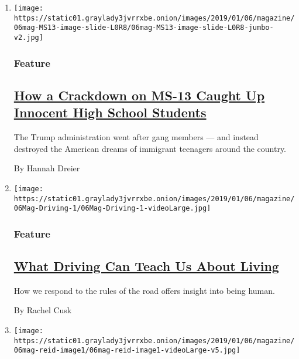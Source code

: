 \begin{enumerate}
\def\labelenumi{\arabic{enumi}.}
\item
  \texttt{[image: https://static01.graylady3jvrrxbe.onion/images/2019/01/06/magazine/06mag-MS13-image-slide-L0R8/06mag-MS13-image-slide-L0R8-jumbo-v2.jpg]}

  \hypertarget{feature}{%
  \subsubsection{Feature}\label{feature}}

  \hypertarget{how-a-crackdown-on-ms-13-caught-up-innocent-high-school-students}{%
  \subsection{\texorpdfstring{\href{/2018/12/27/magazine/ms13-deportation-ice.html}{How
  a Crackdown on MS-13 Caught Up Innocent High School
  Students}}{How a Crackdown on MS-13 Caught Up Innocent High School Students}}\label{how-a-crackdown-on-ms-13-caught-up-innocent-high-school-students}}

  The Trump administration went after gang members --- and instead
  destroyed the American dreams of immigrant teenagers around the
  country.

  By Hannah Dreier
\item
  \texttt{[image: https://static01.graylady3jvrrxbe.onion/images/2019/01/06/magazine/06Mag-Driving-1/06Mag-Driving-1-videoLarge.jpg]}

  \hypertarget{feature-1}{%
  \subsubsection{Feature}\label{feature-1}}

  \hypertarget{what-driving-can-teach-us-about-living}{%
  \subsection{\texorpdfstring{\href{/2019/01/03/magazine/driving-living-reality.html}{What
  Driving Can Teach Us About
  Living}}{What Driving Can Teach Us About Living}}\label{what-driving-can-teach-us-about-living}}

  How we respond to the rules of the road offers insight into being
  human.

  By Rachel Cusk
\item
  \texttt{[image: https://static01.graylady3jvrrxbe.onion/images/2019/01/06/magazine/06mag-reid-image1/06mag-reid-image1-videoLarge-v5.jpg]}


\end{enumerate}
